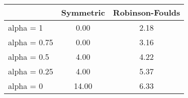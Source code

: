 \documentclass{article}
\begin{document}
\begin{table}[ht]
\centering
\begin{tabular}{lcc}
\hline
& Symmetric & Robinson-Foulds \\ 
\hline
alpha = 1 & 0.00 & 2.18 \\ 
alpha = 0.75 & 0.00 & 3.16 \\ 
alpha = 0.5 & 4.00 & 4.22 \\ 
alpha = 0.25 & 4.00 & 5.37 \\ 
alpha = 0 & 14.00 & 6.33 \\ 
\hline
\end{tabular}
\end{table}
\end{document}
